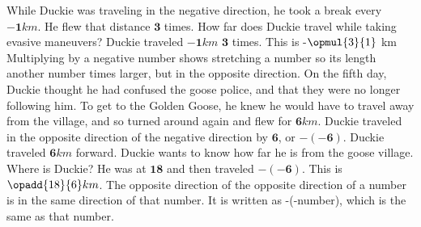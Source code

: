 {}
{While Duckie was traveling in the negative direction, he took a break every $\mathbf{-1} km$. He flew that distance  $\mathbf{3}$ times. How far does Duckie travel while taking evasive maneuvers?}
{Duckie traveled $\mathbf{-1} km$ $\mathbf{3}$ times. This is -$\opmul{3}{1}$ km}
{Multiplying by a negative number shows stretching a number so its length another number times larger, but in the opposite direction. }
{}
{On the fifth day, Duckie thought he had confused the goose police, and that they were no longer following him. To get to the Golden Goose, he knew he would have to travel away from the village, and so turned around again and flew for $\mathbf{6} km$. Duckie traveled in the opposite direction of the negative direction by $\mathbf{6}$, or $\mathbf{-(-6)}$. Duckie traveled $\mathbf{6} km$ forward. Duckie wants to know how far he is from the goose village. Where is Duckie?}
{He was at $\mathbf{18}$ and then traveled $\mathbf{-(-6)}$. This is $\opadd{18}{6} km$.}
{The opposite direction of the opposite direction of a number is in the same direction of that number. It is written as -(-number), which is the same as that number.}
{}
